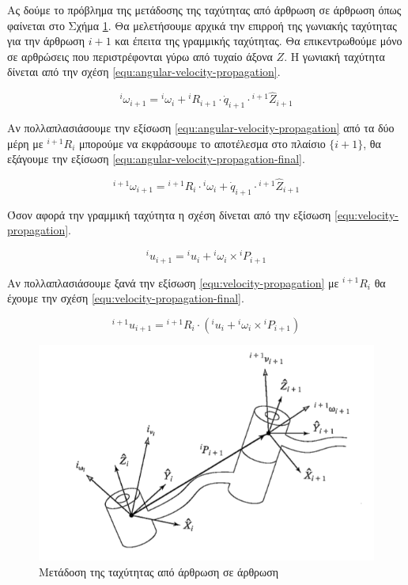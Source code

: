 Ας δούμε το πρόβλημα της μετάδοσης της ταχύτητας από άρθρωση σε άρθρωση όπως φαίνεται στο Σχήμα \ref{fig:velocity-transfer}. Θα μελετήσουμε αρχικά την επιρροή της γωνιακής ταχύτητας για την άρθρωση $i+1$ και έπειτα της γραμμικής ταχύτητας. Θα επικεντρωθούμε μόνο σε αρθρώσεις που περιστρέφονται γύρω από τυχαίο άξονα $Ζ$. Η γωνιακή ταχύτητα δίνεται από την σχέση \ref{equ:angular-velocity-propagation}.

\begin{equation}
    ^i\omega_{i+1} = {}^i\omega_i + {}^iR_{i+1} \cdot \dot{q}_{i+1}
    \cdot {}^{i+1}\hat{Z}_{i+1}
    \label{equ:angular-velocity-propagation}
\end{equation}

Αν πολλαπλασιάσουμε την εξίσωση \ref{equ:angular-velocity-propagation} από τα δύο μέρη με $^{i+1}R_i$ μπορούμε να εκφράσουμε το αποτέλεσμα στο πλαίσιο $\{i+1\}$, θα εξάγουμε την εξίσωση \ref{equ:angular-velocity-propagation-final}.

\begin{equation}
    ^{i+1}\omega_{i+1} = {}^{i+1}R_i \cdot {}^i\omega_i + \dot{q}_{i+1}
    \cdot {}^{i+1}\hat{Z}_{i+1}
    \label{equ:angular-velocity-propagation-final}
\end{equation}

Όσον αφορά την γραμμική ταχύτητα η σχέση δίνεται από την εξίσωση \ref{equ:velocity-propagation}.

\begin{equation}
    ^iu_{i+1} = {}^iu_i + {}^i\omega_i \times {}^iP_{i+1}
    \label{equ:velocity-propagation}
\end{equation}

Αν πολλαπλασιάσουμε ξανά την εξίσωση \ref{equ:velocity-propagation} με $^{i+1}R_i$ θα έχουμε την σχέση \ref{equ:velocity-propagation-final}.

\begin{equation}
    ^{i+1}u_{i+1} = {}^{i+1}R_i \cdot (^iu_i + {}^i\omega_i \times
    {}^iP_{i+1})
    \label{equ:velocity-propagation-final}
\end{equation}

\begin{figure}[H]
    \centering
    \includegraphics[width=.8\textwidth, keepaspectratio]{fig/velocity-transfer.png}
    \caption{Μετάδοση της ταχύτητας από άρθρωση σε άρθρωση \cite{craig95}}
    \label{fig:velocity-transfer}
\end{figure}

